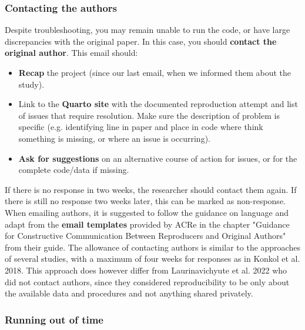 \vspace{0.5cm}
\subsubsection{Contacting the authors}

Despite troubleshooting, you may remain unable to run the code, or have large discrepancies with the original paper. In this case, you should \textbf{contact the original author}. This email should:
\begin{itemize}
    \item \textbf{Recap} the project (since our last email, when we informed them about the study).
    \item Link to the \textbf{Quarto site} with the documented reproduction attempt and list of issues that require resolution. Make sure the description of problem is specific (e.g. identifying line in paper and place in code where think something is missing, or where an issue is occurring).
    \item \textbf{Ask for suggestions} on an alternative course of action for issues, or for the complete code/data if missing.
\end{itemize}

If there is no response in two weeks, the researcher should contact them again. If there is still no response two weeks later, this can be marked as non-response. When emailing authors, it is suggested to follow the guidance on language and adapt from the \textbf{email templates} provided by ACRe in the chapter "Guidance for Constructive Communication Between Reproducers and Original Authors" from their guide.\autocite{berkeley_initiative_for_transparency_in_the_social_sciences_guide_2022} The allowance of contacting authors is similar to the approaches of several studies,\autocite{krafczyk_learning_2021,wood_push_2018,berkeley_initiative_for_transparency_in_the_social_sciences_guide_2022,hardwicke_analytic_2021,konkol_computational_2019} with a maximum of four weeks for responses as in Konkol et al. 2018\autocite{konkol_computational_2019}. This approach does however differ from Laurinavichyute et al. 2022\autocite{laurinavichyute_share_2022} who did not contact authors, since they considered reproducibility to be only about the available data and procedures and not anything shared privately.\autocite{laurinavichyute_share_2022}

\vspace{0.5cm}
\subsubsection{Running out of time}


